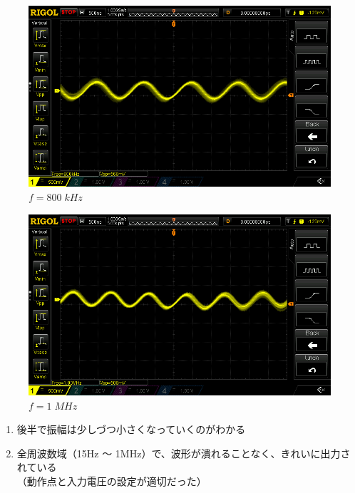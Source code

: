 \documentclass[uplatex,a4paper,11pt,oneside,openany]{jsbook}
\begin{document}
\begin{spacing}{0.67}
  \begin{multicols}{2}
    \begin{figure}[H]
       \centering
        \includegraphics[keepaspectratio, scale=0.28, angle=0]
                    {rigol/figs/FrqCharM1Y1_2kR/800khz.png}
                    \caption{$f=800\;kHz$}
                    \label{fig:frq800k}
    \end{figure}
  
    \begin{figure}[H]
       \centering
        \includegraphics[keepaspectratio, scale=0.28, angle=0]
                  {rigol/figs/FrqCharM1Y1_2kR/1Mhz.png}
                  \caption{$f=1\;MHz$}
                  \label{fig:frq1M}
    \end{figure}
  \end{multicols}
\end{spacing}  

\begin{enumerate}
  \item[(1)] 後半で振幅は少しづつ小さくなっていくのがわかる
  \item[(2)] 全周波数域（15Hz 〜 1MHz）で、波形が潰れることなく、きれいに出力されている\\
（動作点と入力電圧の設定が適切だった）
\end{enumerate}
\end{document}
